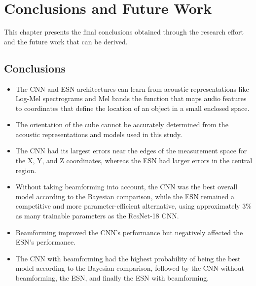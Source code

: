 \chapter{Conclusions and Future Work}
\label{chapter:conclusions-fw}

\newpage

This chapter presents the final conclusions obtained through the research effort and the future work that can be derived. 

\section{Conclusions}

\begin{itemize}
	
	\item The CNN and ESN architectures can learn from acoustic representations like Log-Mel spectrograms and Mel bands the function that maps audio features to coordinates that define the location of an object in a small enclosed space.
	
	\item The orientation of the cube cannot be accurately determined from the acoustic representations and models used in this study.
	
	\item The CNN had its largest errors near the edges of the measurement space for the X, Y, and Z coordinates, whereas the ESN had larger errors in the central region.
	
	\item Without taking beamforming into account, the CNN was the best overall model according to the Bayesian comparison, while the ESN remained a competitive and more parameter-efficient alternative, using approximately 3\% as many trainable parameters as the ResNet-18 CNN.
	
	\item Beamforming improved the CNN's performance but negatively affected the ESN's performance.
	
	\item The CNN with beamforming had the highest probability of being the best model according to the Bayesian comparison, followed by the CNN without beamforming, the ESN, and finally the ESN with beamforming.

\end{itemize}


